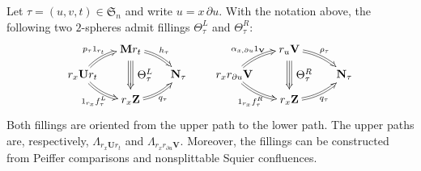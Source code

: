 \documentclass[a4paper, twoside, 11pt, english]{article}
\newcommand{\npath}[1]{\Lambda_{#1}}
\begin{document}
\begin{lemma}
\label{L:NonsplittableTransportFacesFinal}
Let $\tau=(u,v,t)\in\mathfrak S_n$ and write
$u=x\,\partial u$. With the notation above, the following two
$2$-spheres admit fillings $\Theta_\tau^L$ and $\Theta_\tau^R$:
\begin{equation}
\label{eq:TransportFacesSplittableFinal}
\xymatrix @R=0.8em @C=1em @!C {
        & \mathbf M r_t
          \ar@2@/^/[dr]^-{h_\tau}
          \ar@3[]!<0pt,-10pt>;[dd]!<0pt,10pt>
          ^-*+{\Theta_\tau^L}
        \\
r_x\mathbf U r_t
          \ar@2@/^/[ur]^-{p_\tau1_{r_t}}
          \ar@2@/_/[dr]_-{1_{r_x}f_\tau^L}
        && \mathbf N_\tau
        \\
        & r_x\mathbf Z
          \ar@2@/_/[ur]_-{q_\tau}
}
\qquad
\xymatrix @R=0.8em @C=1em @!C {
        & r_u\mathbf V
          \ar@2@/^/[dr]^-{\rho_\tau}
          \ar@3[]!<0pt,-10pt>;[dd]!<0pt,10pt>
          ^-*+{\Theta_\tau^R}
        \\
r_xr_{\partial u}\mathbf V
          \ar@2@/^/[ur]^-{
            \alpha_{x,\partial u}1_{\mathbf V}}
          \ar@2@/_/[dr]_-{1_{r_x}f_\tau^R}
        && \mathbf N_\tau
        \\
        & r_x\mathbf Z
          \ar@2@/_/[ur]_-{q_\tau}
}
\end{equation}
Both fillings are oriented from the upper path to the lower path.
The upper paths are, respectively,
$\npath{r_x\mathbf U r_t}$ and
$\npath{r_xr_{\partial u}\mathbf V}$.
Moreover, the fillings can be constructed from Peiffer comparisons
and nonsplittable Squier confluences.
\end{lemma}
\end{document}
